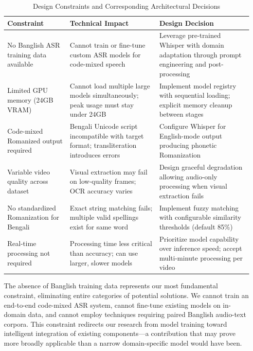 \begin{table}[h]
\centering
\caption{Design Constraints and Corresponding Architectural Decisions}
\label{tab:constraints}
\begin{tabular}{|p{3.5cm}|p{4.5cm}|p{5.5cm}|}
\hline
\textbf{Constraint} & \textbf{Technical Impact} & \textbf{Design Decision} \\
\hline
No Banglish ASR training data available & Cannot train or fine-tune custom ASR models for code-mixed speech & Leverage pre-trained Whisper with domain adaptation through prompt engineering and post-processing \\
\hline
Limited GPU memory (24GB VRAM) & Cannot load multiple large models simultaneously; peak usage must stay under 24GB & Implement model registry with sequential loading; explicit memory cleanup between stages \\
\hline
Code-mixed Romanized output required & Bengali Unicode script incompatible with target format; transliteration introduces errors & Configure Whisper for English-mode output producing phonetic Romanization \\
\hline
Variable video quality across dataset & Visual extraction may fail on low-quality frames; OCR accuracy varies & Design graceful degradation allowing audio-only processing when visual extraction fails \\
\hline
No standardized Romanization for Bengali & Exact string matching fails; multiple valid spellings exist for same word & Implement fuzzy matching with configurable similarity thresholds (default 85\%) \\
\hline
Real-time processing not required & Processing time less critical than accuracy; can use larger, slower models & Prioritize model capability over inference speed; accept multi-minute processing per video \\
\hline
\end{tabular}
\end{table}

The absence of Banglish training data represents our most fundamental constraint, eliminating entire categories of potential solutions. We cannot train an end-to-end code-mixed ASR system, cannot fine-tune existing models on in-domain data, and cannot employ techniques requiring paired Banglish audio-text corpora. This constraint redirects our research from model training toward intelligent integration of existing components---a contribution that may prove more broadly applicable than a narrow domain-specific model would have been.

